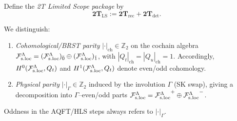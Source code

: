 \begin{definition}
\label{def:2T-LS}
Define the \emph{2T Limited Scope package} by
\[
\mathbf{2T}_{\mathrm{LS}} := \mathbf{2T}_{\mathrm{rec}} + \mathbf{2T}_{\mathrm{det}}.
\]
\end{definition}

\begin{definition}
\label{def:two-gradings}
We distinguish:
\begin{enumerate}[label=\textnormal{(\alph*)},leftmargin=*,itemsep=0.2em]
\item \emph{Cohomological/BRST parity} $|\cdot|_{\mathrm{ch}}\in\mathbb Z_2$ on the
  cochain algebra $\mathcal F_{\mathrm{s.loc}}^\Lambda=(\mathcal F_{\mathrm{s.loc}}^\Lambda)_{\bar 0}\oplus(\mathcal F_{\mathrm{s.loc}}^\Lambda)_{\bar 1}$, with
  $|Q_t|_{\mathrm{ch}}=|Q_u|_{\mathrm{ch}}=1$.
  Accordingly, $H^0(\mathcal F_{\mathrm{s.loc}}^\Lambda,Q_t)$ and $H^1(\mathcal F_{\mathrm{s.loc}}^\Lambda,Q_t)$ denote even/odd cohomology.
\item \emph{Physical parity} $|\cdot|_{\Gamma}\in\mathbb Z_2$ induced by the involution
  $\Gamma$ (SK swap), giving a decomposition into $\Gamma$--even/odd parts
  $\mathcal F_{\mathrm{s.loc}}^\Lambda={\mathcal F_{\mathrm{s.loc}}^\Lambda}^{+}\oplus{\mathcal F_{\mathrm{s.loc}}^\Lambda}^{-}$.
\end{enumerate}
Oddness in the AQFT/HLS steps always refers to $|\cdot|_{\Gamma}$.
\end{definition}

